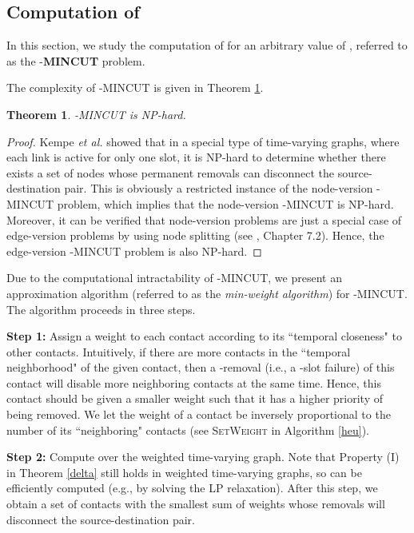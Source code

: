 \documentclass[10pt, conference, letterpaper]{IEEEtran}
\newtheorem{theorem}{Theorem}
\begin{document}
\subsection{Computation of {}}\label{com_mincut}
In this section, we study the computation of  for an arbitrary value of , referred to as the -\textbf{MINCUT} problem.

\noindent The complexity of -MINCUT is given in Theorem \ref{mincut_hardness}.

\begin{theorem}\label{mincut_hardness}
-MINCUT is NP-hard.
\end{theorem}
\begin{proof}
Kempe \emph{et al.} \cite{con} showed that in a special type of time-varying graphs, where each link is active for only one slot, it is NP-hard to determine whether there exists a set of  nodes whose permanent removals can disconnect the source-destination pair. This is obviously a restricted instance of the node-version -MINCUT problem, which implies that the node-version -MINCUT is NP-hard. Moreover, it can be verified that node-version problems are just a special case of edge-version problems by using node splitting (see \cite{LP}, Chapter 7.2). Hence, the edge-version -MINCUT problem is also NP-hard.
\end{proof}

Due to the computational intractability of -MINCUT, we present an approximation algorithm  (referred to as the \emph{min-weight algorithm}) for -MINCUT. The algorithm proceeds in three steps.

\vspace{1mm}

\noindent  \textbf{Step 1:} Assign a weight to each contact according to its ``temporal closeness" to other contacts. Intuitively, if there are more contacts in the ``temporal neighborhood" of the given contact, then a -removal (i.e., a -slot failure) of this contact will disable more neighboring contacts at the same time. Hence, this contact should be given a smaller weight such that it has a higher priority of being removed. We let the weight of a contact be inversely proportional to the number of its ``neighboring" contacts (see \textsc{SetWeight} in Algorithm \ref{heu}).

\vspace{1mm}

\noindent  \textbf{Step 2:} Compute  over the weighted time-varying graph.  Note that Property (I) in Theorem \ref{delta} still holds in weighted time-varying graphs, so  can be efficiently computed (e.g., by solving the LP relaxation). After this step, we obtain a set of contacts  with the smallest sum of weights whose removals will disconnect the source-destination pair.
\end{document}
